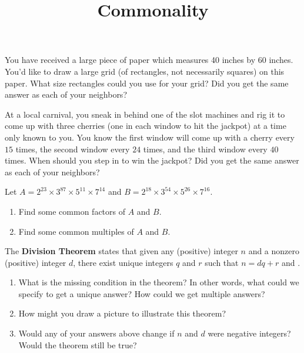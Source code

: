 \documentclass[handout,nooutcomes, noauthor]{ximera}
\title{Commonality}
\begin{document}
\begin{abstract}
\end{abstract}
\maketitle

\begin{problem}
You have received a large piece of paper which measures 40 inches by 60 inches.  You'd like to draw a large grid (of rectangles, not necessarily squares) on this paper.  What size rectangles could you use for your grid?  Did you get the same answer as each of your neighbors?
\vfill
\end{problem}


\begin{problem}
At a local carnival, you sneak in behind one of the slot machines and rig it to come up with three cherries (one in each window to hit the jackpot) at a time only known to you.  You know the first window will come up with a cherry every $15$ times, the second window every $24$ times, and the third window every $40$ times.  When should you step in to win the jackpot?  Did you get the same answer as each of your neighbors?
\vfill
\end{problem}

\newpage
\begin{problem}
Let $A = 2^{23} \times 3^{87} \times 5^{11} \times 7^{14}$ and $B = 2^{18} \times 3^{54} \times 5^{26} \times 7^{16}$.
\begin{enumerate}
    \item Find some common factors of $A$ and $B$.
    \item Find some common multiples of $A$ and $B$.
\end{enumerate}
\vfill
\end{problem}

\begin{problem}
The {\bf Division Theorem} states that given any (positive) integer $n$ and a nonzero (positive) integer $d$, there exist unique integers $q$ and $r$ such that $n=dq+r$ and \hspace{0.5in}.
\begin{enumerate}
    \item What is the missing condition in the theorem?  In other words, what could we specify to get a unique answer?  How could we get multiple answers?
    \item How might you draw a picture to illustrate this theorem?
    \item Would any of your answers above change if $n$ and $d$ were negative integers?  Would the theorem still be true?
\end{enumerate}
\vfill
\end{problem}
\end{document}
